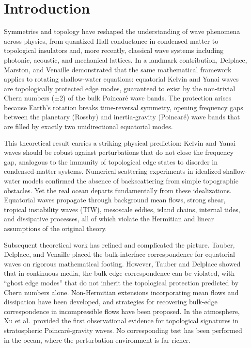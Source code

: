 \documentclass[11pt]{article}
\begin{document}
\maketitle

\section{Introduction}
\label{sec:intro}

Symmetries and topology have reshaped the understanding of wave phenomena across physics, from quantized Hall conductance in condensed matter\cite{Thouless1982} to topological insulators\cite{Hasan2010} and, more recently, classical wave systems including photonic, acoustic, and mechanical lattices. In a landmark contribution, Delplace, Marston, and Venaille demonstrated that the same mathematical framework applies to rotating shallow-water equations: equatorial Kelvin and Yanai waves are topologically protected edge modes, guaranteed to exist by the non-trivial Chern numbers ($\pm 2$) of the bulk Poincar\'e wave bands\cite{Delplace2017}. The protection arises because Earth's rotation breaks time-reversal symmetry, opening frequency gaps between the planetary (Rossby) and inertia-gravity (Poincar\'e) wave bands that are filled by exactly two unidirectional equatorial modes\cite{Matsuno1966,Vallis2017,Berry1984}.

This theoretical result carries a striking physical prediction: Kelvin and Yanai waves should be robust against perturbations that do not close the frequency gap, analogous to the immunity of topological edge states to disorder in condensed-matter systems\cite{Hatsugai1993}. Numerical scattering experiments in idealized shallow-water models confirmed the absence of backscattering from simple topographic obstacles\cite{Delplace2017}. Yet the real ocean departs fundamentally from these idealizations. Equatorial waves propagate through background mean flows, strong shear, tropical instability waves (TIW), mesoscale eddies, island chains, internal tides, and dissipative processes, all of which violate the Hermitian and linear assumptions of the original theory\cite{McPhaden1987,Jezequel2023}.

Subsequent theoretical work has refined and complicated the picture. Tauber, Delplace, and Venaille placed the bulk-interface correspondence for equatorial waves on rigorous mathematical footing\cite{Tauber2019}. However, Tauber and Delplace showed that in continuous media, the bulk-edge correspondence can be violated, with ``ghost edge modes'' that do not inherit the topological protection predicted by Chern numbers alone\cite{Tauber2021}. Non-Hermitian extensions incorporating mean flows and dissipation have been developed\cite{Jezequel2023}, and strategies for recovering bulk-edge correspondence in incompressible flows have been proposed\cite{Onuki2024}. In the atmosphere, Xu et al.\ provided the first observational evidence for topological signatures in stratospheric Poincar\'e-gravity waves\cite{Xu2024}. No corresponding test has been performed in the ocean, where the perturbation environment is far richer.
\end{document}
